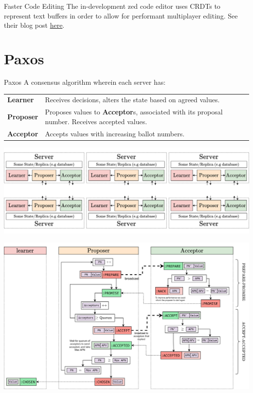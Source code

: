 \begin{sidenotebox}{Faster Code Editing}
    The in-development zed code editor uses CRDTs to represent text buffers in order to allow for performant multiplayer editing. See their blog post \href{https://zed.dev/blog/crdts}{here}.
\end{sidenotebox}

\section{Paxos}
\begin{definitionbox}{Paxos}
    A consensus algorithm wherein each server has:
    \begin{center}
        \begin{tabular}{l p{}}
            \textbf{Learner}  & Receives decisions, alters the state based on agreed values.                                          \\
            \textbf{Proposer} & Proposes values to \textbf{Acceptor}s, associated with its proposal number. Receives accepted values. \\
            \textbf{Acceptor} & Accepts values with increasing ballot numbers.                                                        \\
        \end{tabular}
    \end{center}
\end{definitionbox}
\begin{center}
    \includegraphics[width=\textwidth]{consensus/images/paxos_servers.drawio.png}
\end{center}

\begin{center}
    \includegraphics[width=\textwidth]{consensus/images/paxos_stages.drawio.png}
\end{center}
\unfinished

